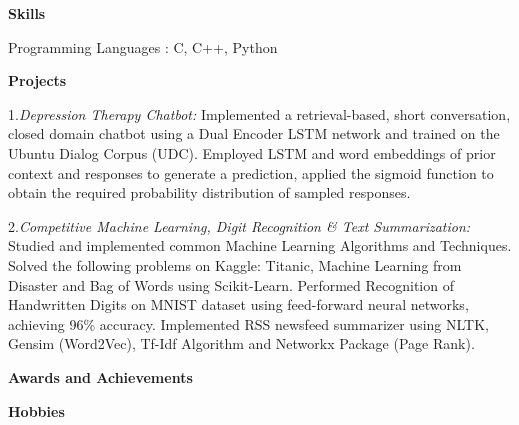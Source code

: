 \documentclass[a4paper, 11pt]{article}
\begin{document}
\noindent\textbf{Skills}

\vspace{1mm}

\noindent Programming Languages :\hspace{2mm} C, C++, Python

\vspace{3mm}

\noindent\textbf{Projects}

\vspace{2mm}
1.{\it Depression Therapy Chatbot:}  Implemented a retrieval-based, short conversation, closed domain chatbot using a Dual Encoder LSTM
network and trained on the Ubuntu Dialog Corpus (UDC). Employed LSTM and word embeddings of prior context and responses to generate a prediction, applied the
sigmoid function to obtain the required probability distribution of sampled responses.

\vspace{1mm}


2.{\it Competitive Machine Learning, Digit Recognition \& Text Summarization:}  Studied and implemented common Machine Learning Algorithms and Techniques. Solved the following problems on Kaggle: Titanic, Machine Learning from Disaster and Bag of Words using Scikit-Learn. Performed Recognition of Handwritten Digits on MNIST dataset using feed-forward neural networks, achieving 96\% accuracy. Implemented RSS newsfeed summarizer using NLTK, Gensim (Word2Vec), Tf-Idf Algorithm and Networkx Package (Page Rank).

\vspace{310mm}

\noindent\textbf{Awards and Achievements}

\vspace{1.5mm}


\vspace{1.5mm}

\vspace{3mm}
 
 
\noindent\textbf{Hobbies}

\vspace{1.5mm}


\vspace{1.5mm}


\vspace{1.5mm}

\end{document}
